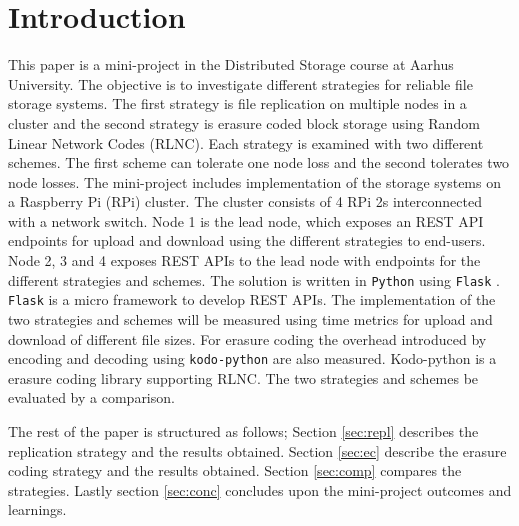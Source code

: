 \section{Introduction}
This paper is a mini-project in the Distributed Storage course at Aarhus University. The objective is to investigate different strategies for reliable file storage systems. The first strategy is file replication on multiple nodes in a cluster and the second strategy is erasure coded block storage using Random Linear Network Codes (RLNC). Each strategy is examined with two different schemes. The first scheme can tolerate one node loss and the second tolerates two node losses. The mini-project includes implementation of the storage systems on a Raspberry Pi (RPi) cluster. The cluster consists of 4 RPi 2s interconnected with a network switch. Node 1 is the lead node, which exposes an REST API endpoints for upload and download using the different strategies to end-users. Node 2, 3 and 4 exposes REST APIs to the lead node with endpoints for the different strategies and schemes. The solution is written in \texttt{Python} using \texttt{Flask} \cite{flask}. \texttt{Flask} is a micro framework to develop REST APIs. The implementation of the two strategies and schemes will be measured using time metrics for upload and download of different file sizes. For erasure coding the overhead introduced by encoding and decoding using \texttt{kodo-python} \cite{kodo} are also measured. Kodo-python is a erasure coding library supporting RLNC. The two strategies and schemes be evaluated by a comparison.

The rest of the paper is structured as follows; Section \ref{sec:repl} describes the replication strategy and the results obtained. Section \ref{sec:ec} describe the erasure coding strategy and the results obtained. Section \ref{sec:comp} compares the strategies. Lastly section \ref{sec:conc} concludes upon the mini-project outcomes and learnings. 